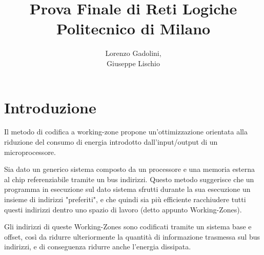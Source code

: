 \documentclass{article}
\title{Prova Finale di Reti Logiche\\ \large Politecnico di Milano}
\author{Lorenzo Gadolini, \\ Giuseppe Lischio}
\begin{document}
\maketitle


\tableofcontents


\newpage
{}




\setcounter{page}{1}


\section{Introduzione}
\begin{flushleft}
Il metodo di codifica a working-zone propone un'ottimizzazione orientata alla riduzione del consumo di energia introdotto dall'input/output di un microprocessore.

\medskip

Sia dato un generico sistema composto da un processore e una memoria esterna al chip referenziabile tramite un bus indirizzi. Questo metodo suggerisce che un programma in esecuzione sul dato sistema sfrutti durante la sua esecuzione un insieme di indirizzi "preferiti", e che quindi sia più efficiente racchiudere tutti questi indirizzi dentro uno spazio di lavoro (detto appunto Working-Zones). 

\medskip

Gli indirizzi di queste Working-Zones sono codificati tramite un sistema base e offset, così da ridurre ulteriormente la quantità di informazione trasmessa sul bus indirizzi, e di conseguenza ridurre anche l'energia dissipata.

\end{flushleft}
\end{document}
